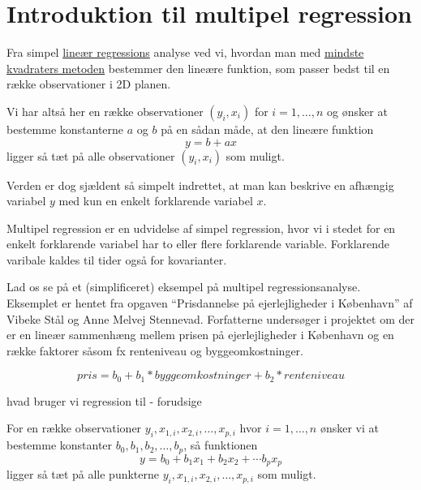 \section{Introduktion til multipel regression}

Fra simpel \href{http://www.webmatematik.dk/lektioner/matematik-b/regression}{lineær
regressions} analyse ved vi, hvordan man med
\href{http://www.webmatematik.dk/lektioner/matematik-b/regression}{mindste kvadraters metoden}
bestemmer den lineære funktion, som passer bedst til en række observationer i 2D planen.

Vi har altså her en række observationer \((y_i, x_i)\) for \(i=1,\ldots,n\) og ønsker at bestemme konstanterne \(a\) og \(b\) på en sådan måde, at den lineære funktion
\begin{displaymath}
  y = b + a x
\end{displaymath}
ligger så tæt på alle observationer \((y_i, x_i)\) som muligt.

Verden er dog sjældent så simpelt indrettet, at man kan beskrive en afhængig variabel \(y\)
med kun en enkelt forklarende variabel \(x\).

Multipel regression er en udvidelse af simpel regression, hvor vi i stedet for en enkelt forklarende
variabel har to eller flere forklarende variable. Forklarende varibale kaldes til tider også for kovarianter.

Lad os se på et (simplificeret) eksempel på multipel regressionsanalyse. Eksemplet er hentet fra
opgaven ``Prisdannelse på ejerlejligheder i København'' af Vibeke Stål og Anne Melvej Stennevad.
Forfatterne undersøger i projektet om der er en lineær sammenhæng mellem prisen på ejerlejligheder i København og en række faktorer såsom fx renteniveau og byggeomkostninger.

\begin{displaymath}
  pris = b_0 + b_1 * byggeomkostninger + b_2 * renteniveau
\end{displaymath}


hvad bruger vi regression til - forudsige



For en række observationer \(y_i,x_{1,i},x_{2,i},\ldots,x_{p,i}\) hvor \(i=1,\ldots,n\) ønsker vi at bestemme konstanter \(b_0,b_1,b_2,\ldots,b_p\), så funktionen
\begin{displaymath}
  y = b_0 + b_1 x_1 + b_2 x_2 + \cdots b_p x_p
\end{displaymath}
ligger så tæt på alle punkterne \(y_i,x_{1,i},x_{2,i},\ldots,x_{p,i}\) som muligt.

